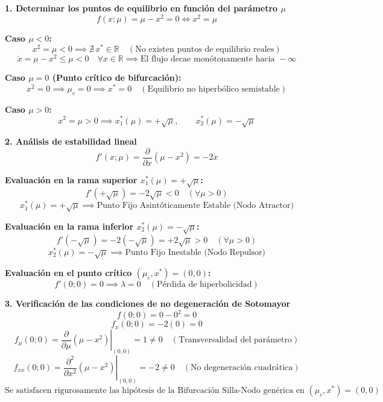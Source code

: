 \documentclass[11pt,a4paper]{article}
\newenvironment{solucion}[1][Solución Detallada]{%
    \vspace{1.5mm}%
    \noindent{\large\textbf{Solución:}}\par\vspace{1.5mm}%
}{%
    \par\vspace{3mm}%
}
\begin{document}
\begin{solucion}

\textbf{\large 1. Determinar los puntos de equilibrio en función del parámetro $\mu$}
\[
f(x; \mu) = \mu - x^2 = 0 \iff x^2 = \mu
\]

\textbf{Caso $\mu < 0$:}
\[
x^2 = \mu < 0 \implies \boxed{\nexists \, x^* \in \mathbb{R} \quad (\text{No existen puntos de equilibrio reales})}
\]
\[
\dot{x} = \mu - x^2 \le \mu < 0 \quad \forall x \in \mathbb{R} \implies \text{El flujo decae monótonamente hacia } -\infty
\]

\textbf{Caso $\mu = 0$ (Punto crítico de bifurcación):}
\[
x^2 = 0 \implies \boxed{\mu_c = 0 \implies x^* = 0 \quad (\text{Equilibrio no hiperbólico semistable})}
\]

\textbf{Caso $\mu > 0$:}
\[
x^2 = \mu > 0 \implies \boxed{x_1^*(\mu) = +\sqrt{\mu}, \qquad x_2^*(\mu) = -\sqrt{\mu}}
\]

\vspace{3.5mm}

\textbf{\large 2. Análisis de estabilidad lineal}
\[
f'(x; \mu) = \frac{\partial}{\partial x}\left(\mu - x^2\right) = -2x
\]

\textbf{Evaluación en la rama superior $x_1^*(\mu) = +\sqrt{\mu}$:}
\[
f'(+\sqrt{\mu}) = -2\sqrt{\mu} < 0 \quad (\forall \mu > 0)
\]
\[
\boxed{x_1^*(\mu) = +\sqrt{\mu} \implies \text{Punto Fijo Asintóticamente Estable (Nodo Atractor)}}
\]

\textbf{Evaluación en la rama inferior $x_2^*(\mu) = -\sqrt{\mu}$:}
\[
f'(-\sqrt{\mu}) = -2(-\sqrt{\mu}) = +2\sqrt{\mu} > 0 \quad (\forall \mu > 0)
\]
\[
\boxed{x_2^*(\mu) = -\sqrt{\mu} \implies \text{Punto Fijo Inestable (Nodo Repulsor)}}
\]

\textbf{Evaluación en el punto crítico $(\mu_c, x^*) = (0, 0)$:}
\[
f'(0; 0) = 0 \implies \boxed{\lambda = 0 \quad (\text{Pérdida de hiperbolicidad}) }
\]

\vspace{3.5mm}

\textbf{\large 3. Verificación de las condiciones de no degeneración de Sotomayor}
\[
f(0; 0) = 0 - 0^2 = 0
\]
\[
f_x(0; 0) = -2(0) = 0
\]
\[
f_\mu(0; 0) = \left.\frac{\partial}{\partial \mu}(\mu - x^2)\right|_{(0,0)} = 1 \neq 0 \quad (\text{Transversalidad del parámetro})
\]
\[
f_{xx}(0; 0) = \left.\frac{\partial^2}{\partial x^2}(\mu - x^2)\right|_{(0,0)} = -2 \neq 0 \quad (\text{No degeneración cuadrática})
\]
\[
\boxed{\text{Se satisfacen rigurosamente las hipótesis de la Bifurcación Silla-Nodo genérica en } (\mu_c, x^*) = (0, 0)}
\]


\end{solucion}
\end{document}
